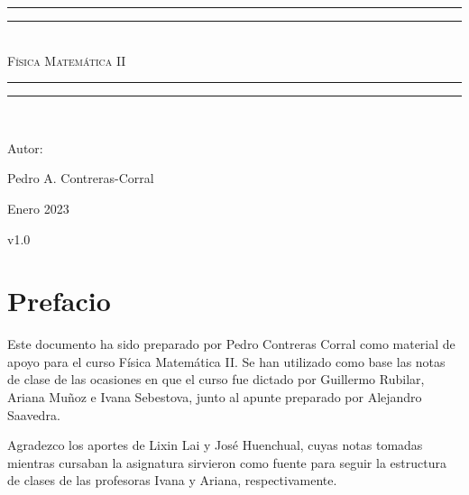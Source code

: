 \documentclass[letterpaper,12pt]{report}
\newlength{\drop}
\theoremstyle{definition}
\begin{document}
\begin{titlepage}
 \textheight
    \centering
    \vspace*{\baselineskip}
    \rule{\textwidth}{1.6pt}\vspace*{-\baselineskip}\vspace*{2pt}
    \rule{\textwidth}{0.4pt}\\[\baselineskip]
    {\scshape\Huge Física Matemática II} \\[0.2\baselineskip]
    \rule{\textwidth}{0.4pt}\vspace*{-\baselineskip}\vspace{3.2pt}
    \rule{\textwidth}{1.6pt}\\[\baselineskip]
    {\Large Autor: \par}
{\large Pedro A. Contreras-Corral \par}
\vfill
{\large Enero 2023 \par}
{\large v1.0 \par}
\end{titlepage}

\chapter*{Prefacio}

Este documento ha sido preparado por Pedro Contreras Corral como material de apoyo para el curso Física Matemática II. Se han utilizado como base las notas de clase de las ocasiones en que el curso fue dictado por Guillermo Rubilar, Ariana Muñoz e Ivana Sebestova, junto al apunte preparado por Alejandro Saavedra.

Agradezco los aportes de Lixin Lai y José Huenchual, cuyas notas tomadas mientras cursaban la asignatura sirvieron como fuente para seguir la estructura de clases de las profesoras Ivana y Ariana, respectivamente.

\tableofcontents


% 







% 

\appendix




\nocite{*} %
\printbibliography[title={Referencias}]
\end{document}

